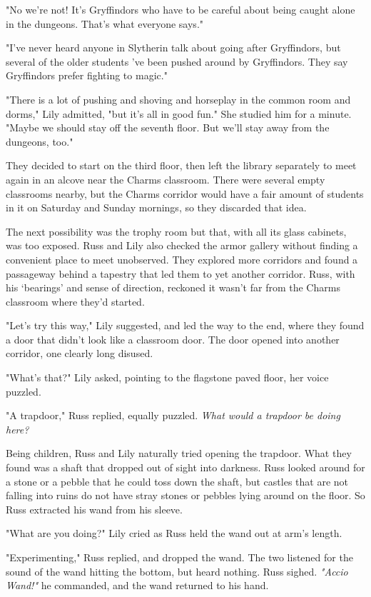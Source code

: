 \documentclass[a4paper,11pt]{article}
\begin{document}
"No we're not! It's Gryffindors who have to be careful about being caught alone in the dungeons. That's what everyone says."

"I've never heard anyone in Slytherin talk about going after Gryffindors, but several of the older students 've been pushed around by Gryffindors. They say Gryffindors prefer fighting to magic."

"There is a lot of pushing and shoving and horseplay in the common room and dorms," Lily admitted, "but it's all in good fun." She studied him for a minute. "Maybe we should stay off the seventh floor. But we'll stay away from the dungeons, too."

They decided to start on the third floor, then left the library separately to meet again in an alcove near the Charms classroom. There were several empty classrooms nearby, but the Charms corridor would have a fair amount of students in it on Saturday and Sunday mornings, so they discarded that idea.

The next possibility was the trophy room but that, with all its glass cabinets, was too exposed. Russ and Lily also checked the armor gallery without finding a convenient place to meet unobserved. They explored more corridors and found a passageway behind a tapestry that led them to yet another corridor. Russ, with his `bearings' and sense of direction, reckoned it wasn't far from the Charms classroom where they'd started.

"Let's try this way," Lily suggested, and led the way to the end, where they found a door that didn't look like a classroom door. The door opened into another corridor, one clearly long disused.

"What's that?" Lily asked, pointing to the flagstone paved floor, her voice puzzled.

"A trapdoor," Russ replied, equally puzzled. \emph{What would a trapdoor be doing here?}

Being children, Russ and Lily naturally tried opening the trapdoor. What they found was a shaft that dropped out of sight into darkness. Russ looked around for a stone or a pebble that he could toss down the shaft, but castles that are not falling into ruins do not have stray stones or pebbles lying around on the floor. So Russ extracted his wand from his sleeve.

"What are you doing?" Lily cried as Russ held the wand out at arm's length.

"Experimenting," Russ replied, and dropped the wand. The two listened for the sound of the wand hitting the bottom, but heard nothing. Russ sighed. \emph{"Accio Wand!"} he commanded, and the wand returned to his hand.
\end{document}
